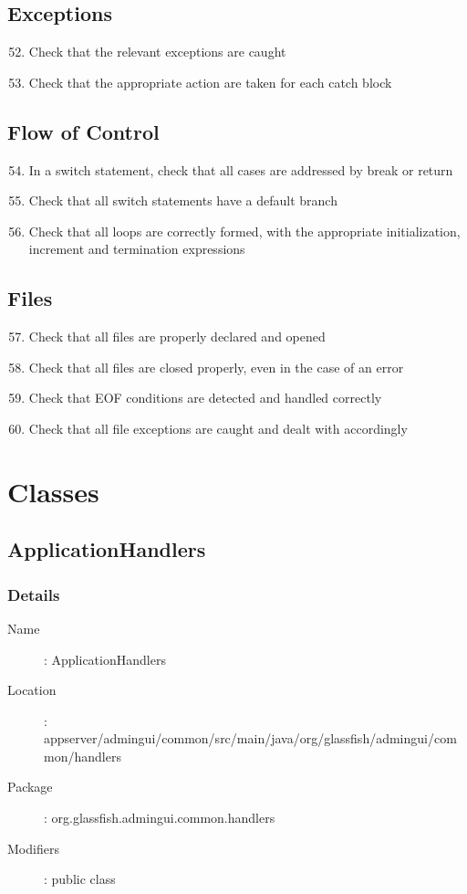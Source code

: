 	\subsection{Exceptions}
	\begin{enumerate}
		\setcounter{enumi}{51}
		\item Check that the relevant exceptions are caught
		\item Check that the appropriate action are taken for each catch block
	\end{enumerate}
	\subsection{Flow of Control}
	\begin{enumerate}
		\setcounter{enumi}{53}
		\item In a switch statement, check that all cases are addressed by break or return
		\item Check that all switch statements have a default branch
		\item Check that all loops are correctly formed, with the appropriate initialization, increment and termination expressions
	\end{enumerate}
	\subsection{Files}
	\begin{enumerate}
		\setcounter{enumi}{56}
		\item Check that all files are properly declared and opened
		\item Check that all files are closed properly, even in the case of an error
		\item Check that EOF conditions are detected and handled correctly
		\item Check that all file exceptions are caught and dealt with accordingly
	\end{enumerate}
\pagebreak
\section{Classes}
	\subsection{ApplicationHandlers}
		\subsubsection{Details}
		\begin{description}
			\item[Name]: ApplicationHandlers
			\item[Location]: appserver/admingui/common/src/main/java/org/glassfish/admingui/common/handlers
			\item[Package]: org.glassfish.admingui.common.handlers
			\item[Modifiers]: public class
		\end{description}
